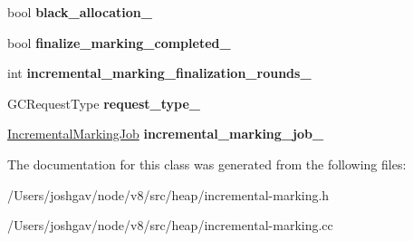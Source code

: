 \begin{DoxyCompactItemize}
\item 
bool {\bfseries black\+\_\+allocation\+\_\+}\hypertarget{classv8_1_1internal_1_1_incremental_marking_a70dec2f95a88585dde4982751e01d620}{}\label{classv8_1_1internal_1_1_incremental_marking_a70dec2f95a88585dde4982751e01d620}

\item 
bool {\bfseries finalize\+\_\+marking\+\_\+completed\+\_\+}\hypertarget{classv8_1_1internal_1_1_incremental_marking_aca3d5e5f819b0fc609e2457a72a4eb4f}{}\label{classv8_1_1internal_1_1_incremental_marking_aca3d5e5f819b0fc609e2457a72a4eb4f}

\item 
int {\bfseries incremental\+\_\+marking\+\_\+finalization\+\_\+rounds\+\_\+}\hypertarget{classv8_1_1internal_1_1_incremental_marking_a77254ee5de84dcc44b96f37309ebe741}{}\label{classv8_1_1internal_1_1_incremental_marking_a77254ee5de84dcc44b96f37309ebe741}

\item 
G\+C\+Request\+Type {\bfseries request\+\_\+type\+\_\+}\hypertarget{classv8_1_1internal_1_1_incremental_marking_a6b841697fd2e825b9240be7729c4bdee}{}\label{classv8_1_1internal_1_1_incremental_marking_a6b841697fd2e825b9240be7729c4bdee}

\item 
\hyperlink{classv8_1_1internal_1_1_incremental_marking_job}{Incremental\+Marking\+Job} {\bfseries incremental\+\_\+marking\+\_\+job\+\_\+}\hypertarget{classv8_1_1internal_1_1_incremental_marking_af081770b247280b279139af6e857e98f}{}\label{classv8_1_1internal_1_1_incremental_marking_af081770b247280b279139af6e857e98f}

\end{DoxyCompactItemize}


The documentation for this class was generated from the following files\+:\begin{DoxyCompactItemize}
\item 
/\+Users/joshgav/node/v8/src/heap/incremental-\/marking.\+h\item 
/\+Users/joshgav/node/v8/src/heap/incremental-\/marking.\+cc\end{DoxyCompactItemize}
